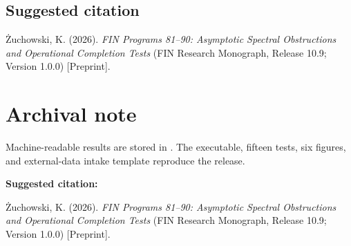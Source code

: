 \documentclass[11pt,a4paper,openany]{report}
\begin{document}
\section{Suggested citation}

\.Zuchowski, K. (2026). \emph{FIN Programs 81--90: Asymptotic Spectral Obstructions and Operational Completion Tests} (FIN Research Monograph, Release 10.9; Version 1.0.0) [Preprint].


\clearpage
\chapter*{Archival note}
Machine-readable results are stored in
.
The executable, fifteen tests, six figures, and external-data intake template
reproduce the release.

\medskip
\noindent\textbf{Suggested citation:}

\.Zuchowski, K. (2026). \emph{FIN Programs 81--90: Asymptotic Spectral
Obstructions and Operational Completion Tests} (FIN Research Monograph,
Release 10.9; Version 1.0.0) [Preprint].
\end{document}
